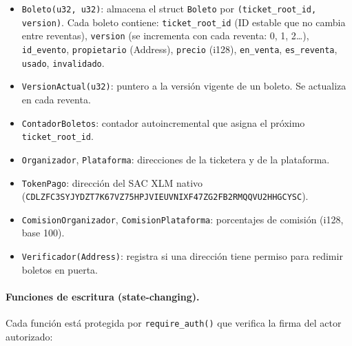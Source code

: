 \documentclass[12pt,oneside]{article}
\begin{document}
\begin{itemize}
  \item \texttt{Boleto(u32, u32)}: almacena el struct \texttt{Boleto} por \texttt{(ticket\_root\_id, version)}. Cada boleto contiene: \texttt{ticket\_root\_id} (ID estable que no cambia entre reventas), \texttt{version} (se incrementa con cada reventa: 0, 1, 2\ldots), \texttt{id\_evento}, \texttt{propietario} (Address), \texttt{precio} (i128), \texttt{en\_venta}, \texttt{es\_reventa}, \texttt{usado}, \texttt{invalidado}.
  \item \texttt{VersionActual(u32)}: puntero a la versión vigente de un boleto. Se actualiza en cada reventa.
  \item \texttt{ContadorBoletos}: contador autoincremental que asigna el próximo \texttt{ticket\_root\_id}.
  \item \texttt{Organizador}, \texttt{Plataforma}: direcciones de la ticketera y de la plataforma.
  \item \texttt{TokenPago}: dirección del SAC XLM nativo (\texttt{CDLZFC3SYJYDZT7K67VZ75HPJVIEUVNIXF47ZG2FB2RMQQVU2HHGCYSC}).
  \item \texttt{ComisionOrganizador}, \texttt{ComisionPlataforma}: porcentajes de comisión (i128, base 100).
  \item \texttt{Verificador(Address)}: registra si una dirección tiene permiso para redimir boletos en puerta.
\end{itemize}

\paragraph{Funciones de escritura (state-changing).} Cada función está protegida por \texttt{require\_auth()} que verifica la firma del actor autorizado:
\end{document}
